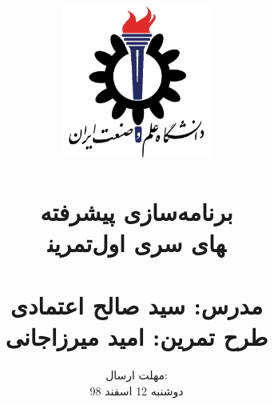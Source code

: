 \title{
    \center
    \includegraphics[width=5cm, height=5cm]{images/IUST_logo_color.png} \\
    \textsc{} \\
    [25pt] 
    
برنامه‌سازی پیشرفته\\
تمرین‎های سری اول\\

 \textsc{\rl{}} \\

مدرس: سید صالح اعتمادی \\

طرح تمرین: امید میرزاجانی
}
\author{
\selectfont
}
\date{
    مهلت ارسال:\\
دوشنبه 12 اسفند 98
}
